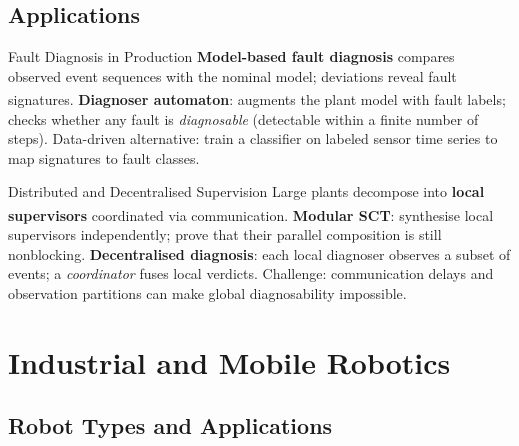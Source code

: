 \subsection{Applications}

\begin{v3topic}{Fault Diagnosis in Production}
    \textbf{Model-based fault diagnosis} compares observed event sequences with the nominal model; deviations reveal fault signatures\textsuperscript{\cite[][pp.~420--450]{cassandrasIntroductionDiscreteEvent2009}}.
    \textbf{Diagnoser automaton}: augments the plant model with fault labels; checks whether any fault is \emph{diagnosable} (detectable within a finite number of steps).
    Data-driven alternative: train a classifier on labeled sensor time series to map signatures to fault classes.

\end{v3topic}
\begin{v3topic}{Distributed and Decentralised Supervision}
    Large plants decompose into \textbf{local supervisors} coordinated via communication\textsuperscript{\cite[][pp.~460--490]{cassandrasIntroductionDiscreteEvent2009}}.
    \textbf{Modular SCT}: synthesise local supervisors independently; prove that their parallel composition is still nonblocking.
    \textbf{Decentralised diagnosis}: each local diagnoser observes a subset of events; a \emph{coordinator} fuses local verdicts.
    Challenge: communication delays and observation partitions can make global diagnosability impossible.
\end{v3topic}

\section{Industrial and Mobile Robotics}

\subsection{Robot Types and Applications}

